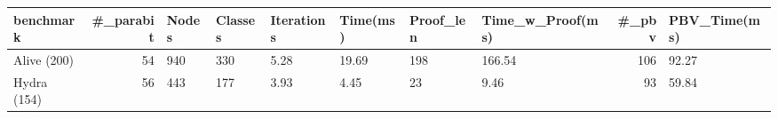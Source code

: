 \begin{tabular}{lrllllllrl}
\toprule
benchmark & #_parabit & Nodes & Classes & Iterations & Time(ms) & Proof_len & Time_w_Proof(ms) & #_pbv & PBV_Time(ms) \\
\midrule
Alive (200) & 54 & 940 & 330 & 5.28 & 19.69 & 198 & 166.54 & 106 & 92.27 \\
Hydra (154) & 56 & 443 & 177 & 3.93 & 4.45 & 23 & 9.46 & 93 & 59.84 \\
\bottomrule
\end{tabular}

